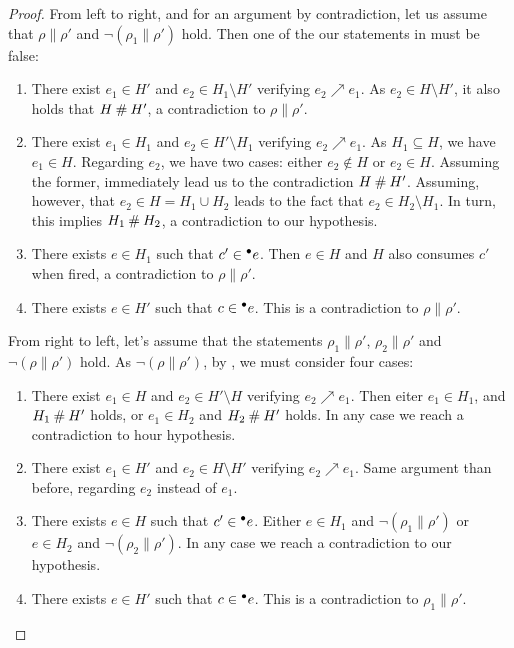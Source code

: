 \documentclass[12pt,a4paper]{article}
\newcommand{\confl}{\ensuremath\mathbin\#}
\begin{document}
\begin{proof}
From left to right, and for an argument by contradiction, let us assume that
$\rho \parallel \rho'$ and $\lnot (\rho_1 \parallel \rho')$ hold.  Then one of
the our statements in  must be false:

\begin{enumerate}
\item There exist $e_1 \in H'$ and $e_2 \in H_1 \setminus H'$ verifying $e_2
\nearrow e_1$.  As $e_2 \in H \setminus H'$, it also holds that $H \confl H'$,
a contradiction to $\rho \parallel \rho'$.

\item There exist $e_1 \in H_1$ and $e_2 \in H' \setminus H_1$ verifying $e_2
\nearrow e_1$.  As $H_1 \subseteq H$, we have $e_1 \in H$.  Regarding $e_2$, we
have two cases: either $e_2 \notin H$ or $e_2 \in H$.  Assuming the former,
immediately lead us to the contradiction $H \confl H'$.  Assuming, however,
that $e_2 \in H = H_1 \cup H_2$ leads to the fact that $e_2 \in H_2 \setminus
H_1$.  In turn, this implies $H_1 \confl H_2$, a contradiction to our
hypothesis.

\item There exists $e \in H_1$ such that $c' \in {}^\bullet e$.  Then $e \in H$ and
$H$ also consumes $c'$ when fired, a contradiction to $\rho \parallel \rho'$.

\item There exists $e \in H'$ such that $c \in {}^\bullet e$.  This is a
contradiction to $\rho \parallel \rho'$.
\end{enumerate}

From right to left, let's assume that the statements $\rho_1 \parallel \rho'$,
$\rho_2 \parallel \rho'$ and $\lnot (\rho \parallel \rho')$ hold.  As $\lnot
(\rho \parallel \rho')$, by , we must consider four cases:

\begin{enumerate}
\item There exist $e_1 \in H$ and $e_2 \in H' \setminus H$ verifying $e_2
\nearrow e_1$.  Then eiter $e_1 \in H_1$, and $H_1 \confl H'$ holds, or $e_1
\in H_2$ and $H_2 \confl H'$ holds. In any case we reach a contradiction to
hour hypothesis.

\item There exist $e_1 \in H'$ and $e_2 \in H \setminus H'$ verifying $e_2
\nearrow e_1$.  Same argument than before, regarding $e_2$ instead of $e_1$.

\item There exists $e \in H$ such that $c' \in {}^\bullet e$.  Either $e \in H_1$ and
$\lnot (\rho_1 \parallel \rho')$ or $e \in H_2$ and $\lnot (\rho_2 \parallel
\rho')$.  In any case we reach a contradiction to our hypothesis.

\item There exists $e \in H'$ such that $c \in {}^\bullet e$.  This is a
contradiction to $\rho_1 \parallel \rho'$.
\end{enumerate}
\end{proof}
\end{document}
